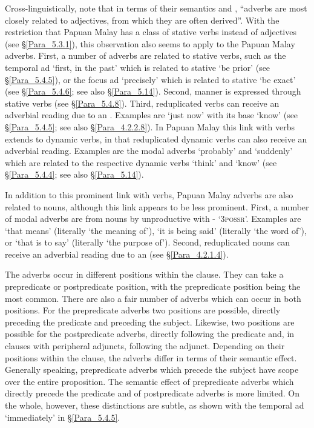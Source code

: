 Cross-linguistically, \citet[66]{Haser.2006} note that in terms of their semantics and , “adverbs are most closely related to adjectives, from which they are often derived”. With the restriction that Papuan Malay has a class of  stative verbs instead of adjectives (see §\ref{Para_5.3.1}), this observation also seems to apply to the Papuan Malay adverbs. First, a number of adverbs are related to  stative verbs, such as the temporal ad  ‘first, in the past’ which is related to stative  ‘be prior’ (see §\ref{Para_5.4.5}), or the focus ad  ‘precisely’ which is related to stative  ‘be exact’ (see §\ref{Para_5.4.6}; see also §\ref{Para_5.14}). Second, manner is expressed through stative verbs (see §\ref{Para_5.4.8}). Third, reduplicated verbs can receive an adverbial reading due to an . Examples are  ‘just now’ with its base  ‘know’ (see §\ref{Para_5.4.5}; see also §\ref{Para_4.2.2.8}). In Papuan Malay this link with verbs extends to dynamic verbs, in that reduplicated dynamic verbs can also receive an adverbial reading. Examples are the modal adverbs  ‘probably’ and  ‘suddenly’ which are related to the respective dynamic verbs  ‘think’ and  ‘know’ (see §\ref{Para_5.4.4}; see also §\ref{Para_5.14}).



In addition to this prominent link with verbs, Papuan Malay adverbs are also related to nouns, although this link appears to be less prominent. First, a number of modal adverbs are  from nouns by unproductive  with - ‘\textsc{3possr}’. Examples are  ‘that means’ (literally ‘the meaning of’),  ‘it is being said’ (literally ‘the word of’), or  ‘that is to say’ (literally ‘the purpose of’). Second, reduplicated nouns can receive an adverbial reading due to an  (see §\ref{Para_4.2.1.4}).


\newpage
The adverbs occur in different positions within the clause. They can take a prepredicate or postpredicate position, with the prepredicate position being the most common. There are also a fair number of adverbs which can occur in both positions. For the prepredicate adverbs two positions are possible, directly preceding the predicate and preceding the subject. Likewise, two positions are possible for the postpredicate adverbs, directly following the predicate and, in clauses with peripheral adjuncts, following the adjunct. Depending on their positions within the clause, the adverbs differ in terms of their semantic effect. Generally speaking, prepredicate adverbs which precede the subject have scope over the entire proposition. The semantic effect of prepredicate adverbs which directly precede the predicate and of postpredicate adverbs is more limited. On the whole, however, these distinctions are subtle, as shown with the temporal ad  ‘immediately’ in §\ref{Para_5.4.5}.



